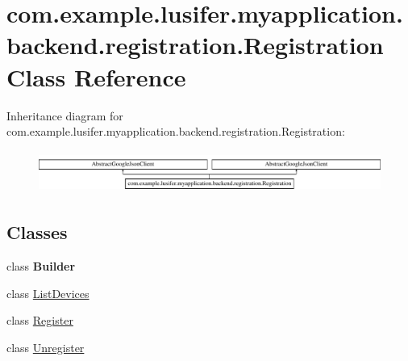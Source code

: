 \hypertarget{classcom_1_1example_1_1lusifer_1_1myapplication_1_1backend_1_1registration_1_1_registration}{}\section{com.\+example.\+lusifer.\+myapplication.\+backend.\+registration.\+Registration Class Reference}
\label{classcom_1_1example_1_1lusifer_1_1myapplication_1_1backend_1_1registration_1_1_registration}
Inheritance diagram for com.\+example.\+lusifer.\+myapplication.\+backend.\+registration.\+Registration\+:\begin{figure}[H]
\begin{center}
\leavevmode
\includegraphics[height=1.393035cm]{classcom_1_1example_1_1lusifer_1_1myapplication_1_1backend_1_1registration_1_1_registration}
\end{center}
\end{figure}
\subsection*{Classes}
\begin{DoxyCompactItemize}
\item 
class {\bfseries Builder}
\item 
class \hyperlink{classcom_1_1example_1_1lusifer_1_1myapplication_1_1backend_1_1registration_1_1_registration_1_1_list_devices}{List\+Devices}
\item 
class \hyperlink{classcom_1_1example_1_1lusifer_1_1myapplication_1_1backend_1_1registration_1_1_registration_1_1_register}{Register}
\item 
class \hyperlink{classcom_1_1example_1_1lusifer_1_1myapplication_1_1backend_1_1registration_1_1_registration_1_1_unregister}{Unregister}
\end{DoxyCompactItemize}
